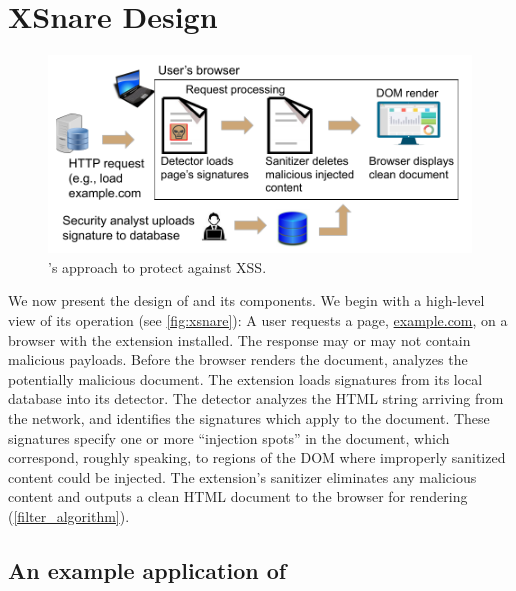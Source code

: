 \section{XSnare Design} \label{xsnare_design}

 \begin{figure}[h]
	\includegraphics[scale=0.55]{img/xsnare.pdf}
	\caption{\sys's approach to protect against XSS.}
	\label{fig:xsnare}
\end{figure}

We now present the design of \sys and its components. %
%
%
We begin with a high-level view of its operation (see
\autoref{fig:xsnare}): A user requests a page, \url{example.com}, on a
browser with the \sys extension installed.
%
The response may or may not contain
malicious \xss payloads.
%
Before the browser renders the document, \sys analyzes
the potentially malicious document. The extension loads signatures
from its local database into its detector. The detector analyzes the
HTML string arriving from the network, and identifies the signatures
which apply to the document. These signatures specify one or more
``injection spots'' in the document, which correspond, roughly
speaking, to regions of the DOM where improperly sanitized content
could be injected.  The extension's sanitizer
eliminates any malicious content and outputs a clean HTML document to
the browser for rendering (\autoref{filter_algorithm}).


\subsection{An example application of \sys} \label{motivating_example}

